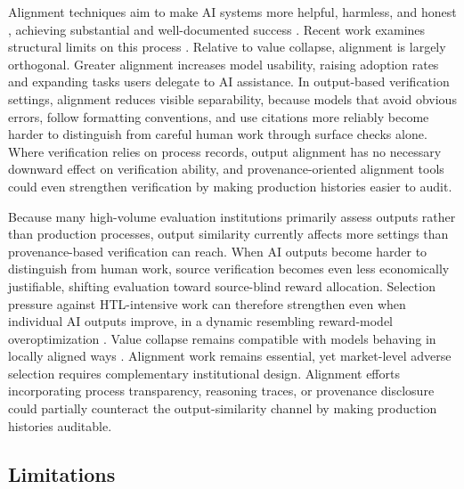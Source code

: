 \documentclass{article}
\theoremstyle{plain}
\theoremstyle{definition}
\theoremstyle{remark}
\begin{document}
Alignment techniques aim to make AI systems more helpful, harmless, and honest \citep{ziegler2020finetuninglanguagemodelshuman, NEURIPS2022_b1efde53, bai2022traininghelpfulharmlessassistant, bai2022constitutionalaiharmlessnessai, openai2024gpt4technicalreport}, achieving substantial and well-documented success \citep{openai2024gpt4ocard, openai2024openaio1card, perez-etal-2023-discovering, sharma2024towards}. Recent work examines structural limits on this process \citep{cao2025alignmentbottleneck}. Relative to value collapse, alignment is largely orthogonal. Greater alignment increases model usability, raising adoption rates and expanding tasks users delegate to AI assistance. In output-based verification settings, alignment reduces visible separability, because models that avoid obvious errors, follow formatting conventions, and use citations more reliably become harder to distinguish from careful human work through surface checks alone. Where verification relies on process records, output alignment has no necessary downward effect on verification ability, and provenance-oriented alignment tools could even strengthen verification by making production histories easier to audit.

Because many high-volume evaluation institutions primarily assess outputs rather than production processes, output similarity currently affects more settings than provenance-based verification can reach. When AI outputs become harder to distinguish from human work, source verification becomes even less economically justifiable, shifting evaluation toward source-blind reward allocation. Selection pressure against HTL-intensive work can therefore strengthen even when individual AI outputs improve, in a dynamic resembling reward-model overoptimization \citep{gao2023scaling}. Value collapse remains compatible with models behaving in locally aligned ways \citep{kulveit2025gradualdisempowermentsystemicexistential, doi:10.1126/science.adn0117}. Alignment work remains essential, yet market-level adverse selection requires complementary institutional design. Alignment efforts incorporating process transparency, reasoning traces, or provenance disclosure could partially counteract the output-similarity channel by making production histories auditable.

\subsection{Limitations}
\label{sec:limitations}
\end{document}
